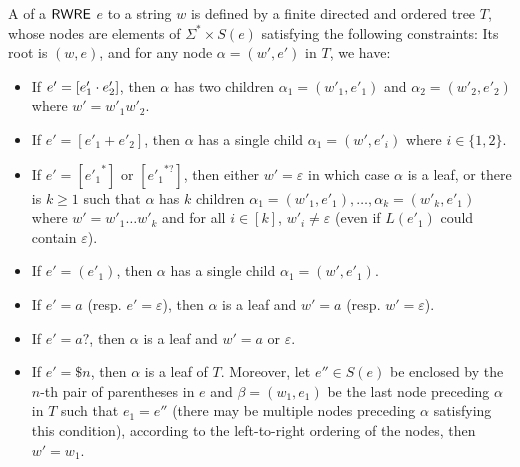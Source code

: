   \begin{definition}
  	A  of a ${\sf RWRE}$ $e$ to a string $w$ is defined by a finite directed and ordered
  	tree $T$, whose nodes are elements of $\Sigma^{\ast} \times S (e)$ satisfying the following constraints: Its root is $(w, e)$, and for any node $\alpha =
  	(w', e')$ in $T$, we have:
  	\begin{itemize}
  		\item If $e' = [e'_1 \cdot e'_2]$, then $\alpha$ has two children $\alpha_1 = (w'_1,
  		e'_1)$ and $\alpha_2=(w'_2, e'_2)$ where $w' = w'_1 w'_2$.
  		
  		\item If $e' = [e'_1 + e'_2]$, then $\alpha$ has a single child $\alpha_1 = (w',
  		e'_i)$ where $i \in \{ 1, 2 \}$.
  		
  		\item If $e' = [{e'_1}^{\ast}]$ or $[{e'_1}^{\ast ?}]$, then either $w' = \varepsilon$ in which case $\alpha$ is a
  		leaf, or there is $k \geqslant 1$ such that $\alpha$ has $k$ children $\alpha_1 = (w'_1,
  		e'_1), \ldots, \alpha_k = (w'_k, e'_1)$ where $w' = w'_1 \ldots w'_k$ and for all
  		$i \in [k]$, $w'_i \neq \varepsilon$ (even if  $L
  		(e'_1)$ could contain $\varepsilon$).
%
%		
  		\item If $e' = (e'_1)$, then $\alpha$ has a single child $\alpha_1 = (w', e'_1)$.
  		\item If $e' = a$ (resp. $e' = \varepsilon$), then $\alpha$ is a leaf and
  		$w' = a$ (resp. $w' = \varepsilon$).
%		
  		\item If $e' = a?$, then $\alpha$ is a leaf and
  		$w' = a$ or $\varepsilon$.
%
		\item If $e' = \$n$, then $\alpha$ is a leaf of $T$. Moreover, let $e'' \in S(e)$ be enclosed by the $n$-th pair of parentheses in $e$ and $\beta = (w_1, e_1)$ be the last node preceding $\alpha$ in $T$ such that $e_1 = e''$ (there may be multiple nodes preceding $\alpha$ satisfying this condition), 
		according to the left-to-right ordering of the nodes, then $w' = w_1$.
  	\end{itemize}
  	

\end{definition}
